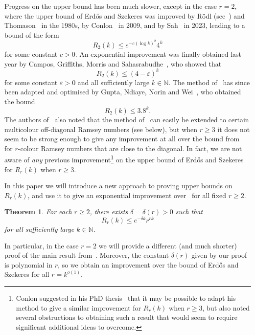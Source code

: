 \documentclass[12pt,reqno]{amsart}
\newtheorem{theorem}{Theorem}[section]
\theoremstyle{definition}
\theoremstyle{remark}
\newcommand\N{\mathbb{N}}
\newcommand\eps{\varepsilon}
\renewcommand{\le}{\leqslant}
\renewcommand{\ge}{\geqslant}
\def\eps{\varepsilon}
\def\N{\mathbb{N}}
\begin{document}
Progress on the upper bound has been much slower, except in the case $r = 2$, where the upper bound of Erd\H{o}s and Szekeres was improved by R\"odl (see~\cite{GR}) and Thomason~\cite{T88} in the 1980s, by Conlon~\cite{C09} in 2009, and by Sah~\cite{S23} in 2023, leading to a bound of the form
$$R_2(k) \le e^{- c(\log k)^2} 4^k$$
for some constant $c > 0$. An exponential improvement was finally obtained last year by Campos, Griffiths, Morris and Sahasrabudhe~\cite{CGMS}, who showed that
$$R_2(k) \le (4 - \eps)^k$$ 
for some constant $\eps > 0$ and all sufficiently large $k \in \N$. The method of~\cite{CGMS} has since been adapted and optimised by Gupta, Ndiaye, Norin and Wei~\cite{GNNW}, who obtained the bound
$$R_2(k) \le 3.8^k.$$ 
The authors of~\cite{GNNW} also noted that the method of~\cite{CGMS} can easily be extended to certain multicolour off-diagonal Ramsey numbers (see below), but when $r \ge 3$ it does not seem to be strong enough to give any improvement at all over the %
bound from~\cite{ESz35} for $r$-colour Ramsey numbers that are close to the diagonal. In fact, we are not aware of \emph{any} previous improvement\footnote{Conlon suggested in his PhD thesis~\cite[page~46]{CPhD} that it may be possible to adapt his method to give a similar improvement for $R_r(k)$ when $r \ge 3$, but also noted several obstructions to obtaining such a result that would seem to require significant additional ideas to overcome.} %
on the upper bound of Erd\H{o}s and Szekeres for %
$R_r(k)$ when $r \ge 3$. 

In this paper we will introduce a new approach to proving upper bounds on $R_r(k)$, and use it to give an exponential improvement over~\cite{ESz35} for all fixed $r \ge 2$. 
 
\begin{theorem}\label{thm:Ramsey:multicolour}
For each $r \ge 2$, there exists $\delta = \delta(r) > 0$ such that 
$$R_r(k) \le e^{-\delta k} r^{rk}$$ 
for all sufficiently large $k \in \N$. 
\end{theorem}

In particular, in the case $r = 2$ we will provide a different (and much shorter) proof of the main result from~\cite{CGMS}. Moreover, the constant $\delta(r)$ given by our proof is polynomial in $r$, so we obtain an improvement over the bound of Erd\H{o}s and Szekeres for all $r = k^{o(1)}$. 
\end{document}

